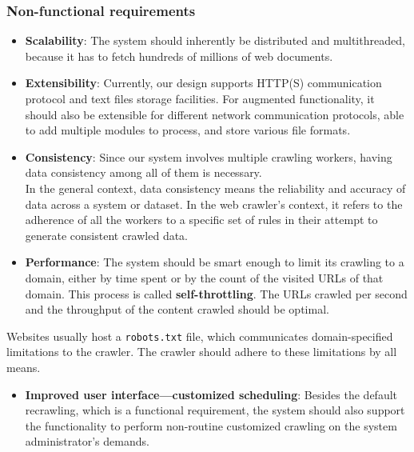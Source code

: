 \subsubsection{Non-functional requirements}\label{GqWa2BqUX3ML-wYuBFpXc}

\begin{itemize}
\item
\protect{}\label{IkE2XouSmsLJKXP6MsGOZ}
\textbf{Scalability}: The system should inherently be distributed and multithreaded, because it has to fetch hundreds of millions of web documents.
\item
\protect{}\label{sIUyVieKzQJur8yg8vS-O}
\textbf{Extensibility}: Currently, our design supports HTTP(S) communication protocol and text files storage facilities. For augmented functionality, it should also be extensible for different network communication protocols, able to add multiple modules to process, and store various file formats.
\item
\protect{}\label{BycBpeKpoAlvB8Cp7EkOt}
\textbf{Consistency}: Since our system involves multiple crawling workers, having data consistency among all of them is necessary.\\
In the general context, data consistency means the reliability and accuracy of data across a system or dataset. In the web crawler's context, it refers to the adherence of all the workers to a specific set of rules in their attempt to generate consistent crawled data.
\item
\protect{}\label{qL1dAhhnntylRWYurOro7}
\textbf{Performance}: The system should be smart enough to limit its crawling to a domain, either by time spent or by the count of the visited URLs of that domain. This process is called \textbf{self-throttling}. The URLs crawled per second and the throughput of the content crawled should be optimal.
\end{itemize}

Websites usually host a \texttt{robots.txt} file, which communicates domain-specified limitations to the crawler. The crawler should adhere to these limitations by all means.

\begin{itemize}
\item
\protect{}\label{2LWT05HnoZW2T0hoMe9Eb}
\textbf{Improved user interface---customized scheduling}: Besides the default recrawling, which is a functional requirement, the system should also support the functionality to perform non-routine customized crawling on the system administrator's demands.
\end{itemize}

